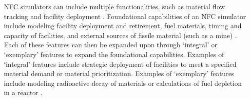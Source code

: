 \gls{NFC} simulators can include multiple functionalities, 
such as material flow tracking and facility deployment \cite{brown_identification_2016}.
Foundational capabilities of an \gls{NFC} simulator include modeling 
facility deployment and retirement, fuel materials, timing and capacity of 
facilities, and external sources of fissile material (such as a mine) 
\cite{brown_identification_2016}. Each of these features can then be 
expanded upon through `integral' or `exemplary' features to expand the 
foundational capabilities. Examples of `integral' 
features include strategic deployment of facilities to meet a specified 
material demand or material prioritization. Examples of `exemplary' 
features include modeling radioactive decay of materials or calculations 
of fuel depletion in a reactor \cite{brown_identification_2016}. 

